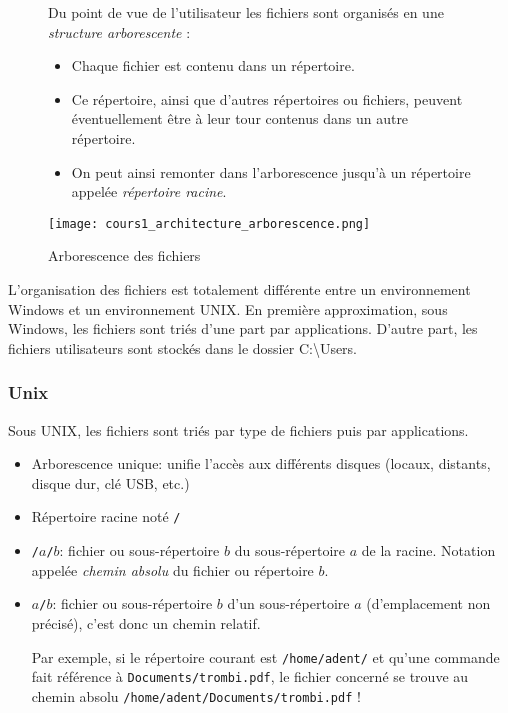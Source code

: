 \begin{figure}[!htb]
\begin{minipage}{0.5\textwidth}
Du point de vue de l'utilisateur les fichiers sont organisés en une \emph{structure arborescente} :
\begin{itemize}
	\item Chaque fichier est contenu dans un répertoire. 
	\item Ce répertoire, ainsi que d'autres répertoires ou fichiers, peuvent éventuellement être à leur tour contenus dans un autre répertoire.
	\item On peut ainsi remonter dans l'arborescence jusqu'à un répertoire appelée \emph{répertoire racine}.
\end{itemize}

\end{minipage}
\begin{minipage}{0.5\textwidth}
\begin{center}
\texttt{[image: cours1\_architecture\_arborescence.png]}\\
\caption{Arborescence des fichiers \label{arbo}}
\end{center}
\end{minipage}
\end{figure}


\begin{remarque}
L'organisation des fichiers est totalement différente entre un environnement Windows et un environnement UNIX. 
En première approximation, sous Windows, les fichiers sont triés d'une part par applications. D'autre part, les fichiers utilisateurs sont stockés dans le dossier C:\textbackslash Users.
\end{remarque}



\subsubsection{Unix}

Sous UNIX, les fichiers sont triés par type de fichiers puis par applications. 

\begin{itemize}
\item Arborescence unique: unifie l'accès aux différents disques
  (locaux, distants, disque dur, clé USB, etc.)
\item Répertoire racine noté \texttt{/}
\item \texttt{/$a$/$b$}: fichier ou sous-répertoire  $b$ du
  sous-répertoire $a$ de la racine. Notation appelée \emph{chemin
    absolu} du fichier ou répertoire $b$.
\item \texttt{$a$/$b$}: fichier ou sous-répertoire $b$ d'un sous-répertoire $a$ (d'emplacement non précisé), c'est donc un chemin relatif. 
	  
	  Par exemple, si le répertoire courant est \texttt{/home/adent/} et qu'une commande fait référence à \texttt{Documents/trombi.pdf}, le fichier concerné se trouve au chemin absolu \texttt{/home/adent/Documents/trombi.pdf} !
\end{itemize}

